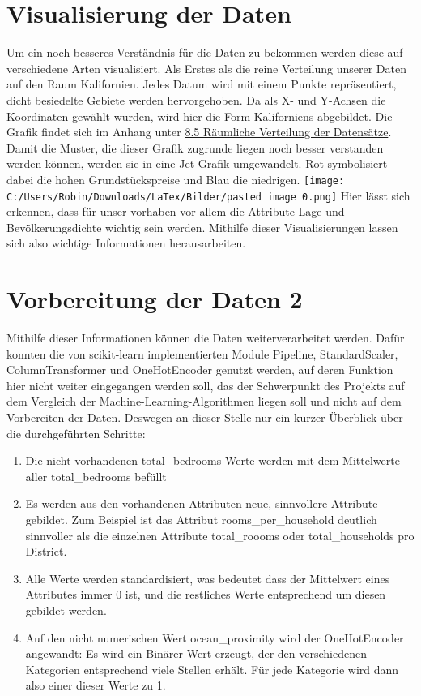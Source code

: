 \section{Visualisierung der Daten}
\label{visualisierungDerDaten}
Um ein noch besseres Verständnis für die Daten zu bekommen werden diese auf verschiedene Arten visualisiert. Als Erstes als die reine Verteilung unserer Daten auf den Raum Kalifornien. Jedes Datum wird mit einem Punkte repräsentiert, dicht besiedelte Gebiete werden hervorgehoben. Da als X- und Y-Achsen die Koordinaten gewählt wurden, wird hier die Form Kaliforniens abgebildet. Die Grafik findet sich im Anhang unter \hyperlink{datensatz}{8.5 Räumliche Verteilung der Datensätze}.
Damit die Muster, die dieser Grafik zugrunde liegen noch besser verstanden werden können, werden sie in eine Jet-Grafik umgewandelt. Rot symbolisiert dabei die hohen Grundstückspreise und Blau die niedrigen.
\newline
\texttt{[image: C:/Users/Robin/Downloads/LaTex/Bilder/pasted image 0.png]}
\newline
Hier lässt sich erkennen, dass für unser vorhaben vor allem die Attribute Lage und Bevölkerungsdichte wichtig sein werden. Mithilfe dieser Visualisierungen lassen sich also wichtige Informationen herausarbeiten.


\section{Vorbereitung der Daten 2}
\label{VorbereitungDerDaten2}
Mithilfe dieser Informationen können die Daten weiterverarbeitet werden. 
Dafür konnten die von scikit-learn implementierten Module Pipeline, StandardScaler, ColumnTransformer und OneHotEncoder genutzt werden, auf deren Funktion hier nicht weiter eingegangen werden soll, das der Schwerpunkt des Projekts auf dem Vergleich der Machine-Learning-Algorithmen liegen soll und nicht auf dem Vorbereiten der Daten. Deswegen an dieser Stelle nur ein kurzer Überblick über die durchgeführten Schritte:
\begin{enumerate}
\item Die nicht vorhandenen total\_bedrooms Werte werden mit dem Mittelwerte aller total\_bedrooms befüllt
\item Es werden aus den vorhandenen Attributen neue, sinnvollere Attribute gebildet. Zum Beispiel ist das Attribut rooms\_per\_household deutlich sinnvoller als die einzelnen Attribute total\_roooms oder total\_households pro District.
\item Alle Werte werden standardisiert, was bedeutet dass der Mittelwert eines Attributes immer 0 ist, und die restliches Werte entsprechend um diesen gebildet werden.
\item Auf den nicht numerischen Wert ocean\_proximity wird der OneHotEncoder angewandt: Es wird ein Binärer Wert erzeugt, der den verschiedenen Kategorien entsprechend viele Stellen erhält. Für jede Kategorie wird dann also einer dieser Werte zu 1.
\end{enumerate}


